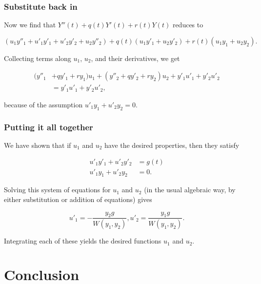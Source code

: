 \documentclass[11pt,ignorenonframetext,]{beamer}
\begin{document}
\begin{frame}\frametitle{Substitute back in}

Now we find that $Y''(t) + q(t)Y'(t) + r(t)Y(t)$ reduces to

\begin{equation*}
    (u_1 y''_1 + u'_1 y'_1 + u'_2 y'_2 + u_2 y''_2) + q(t)(u_1 y'_1 + u_2 y'_2)
    + r(t)(u_1 y_1 + u_2 y_2).
\end{equation*}

Collecting terms along $u_1$, $u_2$, and their derivatives, we get

\begin{align*}
    (y''_1  & + qy'_1 + ry_1)u_1 + (y''_2 + qy'_2 + ry_2)u_2 + y'_1 u'_1 + y'_2 u'_2 \\
    &= y'_1 u'_1 + y'_2 u'_2,
\end{align*}

because of the assumption $u'_1 y_1 + u'_2 y_2  = 0$.

\end{frame}

\begin{frame}\frametitle{Putting it all together}

We have shown that if $u_1$ and $u_2$ have the desired properties, then
they satisfy

\begin{align*}
    u'_1 y'_1 + u'_2 y'_2 &= g(t) \\
    u'_1 y_1 + u'_2 y_2  &= 0.
\end{align*}

Solving this system of equations for $u_1$ and $u_2$ (in the usual
algebraic way, by either substitution or addition of equations) gives

\begin{equation*}
    u'_1 = -\frac{y_2 g}{W(y_1, y_2)}, u'_2 = \frac{y_1 g}{W(y_1, y_2)}.
\end{equation*}

Integrating each of these yields the desired functions $u_1$ and $u_2$.

\end{frame}

\section{Conclusion}
\end{document}
